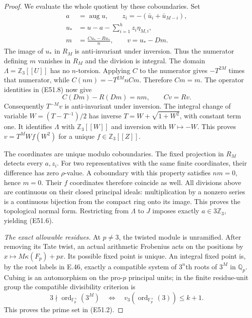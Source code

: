 \begin{proof}
We evaluate the whole quotient by these
coboundaries. Set
\[
 \begin{split}
 a&=\operatorname{aug}u,\qquad
 z_i=-(\bar u_i+\bar u_{M-i}),\\
 u_*&=u-a-\sum_{i=1}^h z_i\eta_{M,i},\\
 m&=\frac{Cu_*-Ru_*}{n},\qquad
                  v=u_*-Dm.
 \end{split}                                                   \tag{E51.10}
\]
The image of $u_*$ in $R_M$ is anti-invariant
under inversion. Thus the numerator defining $m$
vanishes in $R_M$ and the division is integral.
The domain $\Lambda=\mathbb Z_3[[U]]$ has no
$n$-torsion. Applying $C$ to the numerator gives
$-T^{2M}$ times that numerator, while
$C(nm)=-T^{2M}nCm$. Therefore $Cm=m$.
The operator identities in (E51.8) now give
\[
 C(Dm)-R(Dm)=nm,\qquad Cv=Rv.
 \tag{E51.11}
\]
Consequently $T^{-M}v$ is anti-invariant under
inversion. The integral change of variable
$W=(T-T^{-1})/2$ has inverse
$T=W+\sqrt{1+W^2}$, with constant term one.
It identifies $\Lambda$ with $\mathbb Z_3[[W]]$
and inversion with $W\mapsto-W$. This proves
$v=T^M Wf(W^2)$ for a unique $f\in\mathbb Z_3[[Z]]$.

The coordinates are unique modulo coboundaries.
The fixed projection in $R_M$ detects every $a,z_i$.
For two representatives with the same finite
coordinates, their difference has zero
$\rho$-value. A coboundary with this property
satisfies $nm=0$, hence $m=0$. Their $f$
coordinates therefore coincide as well.
All divisions above are continuous on their
closed principal ideals: multiplication by a
nonzero series is a continuous bijection from
the compact ring onto its image. This proves
the topological normal form. Restricting from
$\Lambda$ to $J$ imposes exactly
$a\in3\mathbb Z_3$, yielding (E51.6).

\emph{The exact allowable residues.}
At $p\ne3$, the twisted module is unramified.
After removing its Tate twist, an actual
arithmetic Frobenius acts on the positions by
$x\mapsto M\kappa(F_p)+px$. Its possible fixed
point is unique. An integral fixed point is,
by the root labels in E.46, exactly a compatible
system of $3^n$th roots of $3^M$ in $\mathbb Q_p$.
Cubing is an automorphism on the pro-$p$
principal units; in the finite residue-unit
group the compatible divisibility criterion
is
\[
 3\nmid\operatorname{ord}_{\mathbb F_p^\times}(3^M)
 \quad\Longleftrightarrow\quad
 v_3(\operatorname{ord}_{\mathbb F_p^\times}(3))\le k+1.
 \tag{E51.12}
\]
This proves the prime set in (E51.2).


\end{proof}
